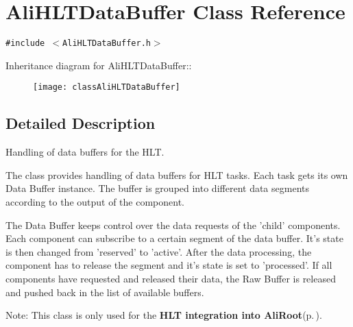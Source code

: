 \section{Ali\-HLTData\-Buffer Class Reference}
\label{classAliHLTDataBuffer}
{\tt \#include $<$Ali\-HLTData\-Buffer.h$>$}

Inheritance diagram for Ali\-HLTData\-Buffer::\begin{figure}[H]
\begin{center}
\leavevmode
\texttt{[image: classAliHLTDataBuffer]}
\end{center}
\end{figure}


\subsection{Detailed Description}
Handling of data buffers for the HLT. 

The class provides handling of data buffers for HLT tasks. Each task gets its own Data Buffer instance. The buffer is grouped into different data segments according to the output of the component.\par
 The Data Buffer keeps control over the data requests of the 'child' components. Each component can subscribe to a certain segment of the data buffer. It's state is then changed from 'reserved' to 'active'. After the data processing, the component has to release the segment and it's state is set to 'processed'. If all components have requested and released their data, the Raw Buffer is released and pushed back in the list of available buffers.

\begin{Desc}
\item[Note:]This class is only used for the {\bf HLT integration into Ali\-Root}{\rm (p.\,\pageref{group__alihlt__system})}. \end{Desc}




